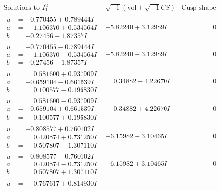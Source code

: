 \documentclass[1p]{elsarticle_modified}
\theoremstyle{definition}
\newcommand{\I}{\sqrt{-1}}
\begin{document}
$$\begin{array}{c|c|c}
\text{Solutions to }I^u_{1}& \I (\text{vol} + \sqrt{-1}CS) & \text{Cusp shape}\\
 \hline 
\begin{aligned}
u &= -0.770455 + 0.789444 I \\
a &= \phantom{-}1.106370 + 0.534564 I \\
b &= -0.27456 - 1.87357 I\end{aligned}
 & -5.82240 + 3.12989 I & \phantom{-0.000000 } 0 \\ \hline\begin{aligned}
u &= -0.770455 - 0.789444 I \\
a &= \phantom{-}1.106370 - 0.534564 I \\
b &= -0.27456 + 1.87357 I\end{aligned}
 & -5.82240 - 3.12989 I & \phantom{-0.000000 } 0 \\ \hline\begin{aligned}
u &= \phantom{-}0.581600 + 0.937909 I \\
a &= -0.659104 - 0.661539 I \\
b &= \phantom{-}0.100577 - 0.196830 I\end{aligned}
 & \phantom{-}0.34882 - 4.22670 I & \phantom{-0.000000 } 0 \\ \hline\begin{aligned}
u &= \phantom{-}0.581600 - 0.937909 I \\
a &= -0.659104 + 0.661539 I \\
b &= \phantom{-}0.100577 + 0.196830 I\end{aligned}
 & \phantom{-}0.34882 + 4.22670 I & \phantom{-0.000000 } 0 \\ \hline\begin{aligned}
u &= -0.808577 + 0.760102 I \\
a &= \phantom{-}0.420874 + 0.731250 I \\
b &= \phantom{-}0.507807 - 1.307110 I\end{aligned}
 & -6.15982 - 3.10465 I & \phantom{-0.000000 } 0 \\ \hline\begin{aligned}
u &= -0.808577 - 0.760102 I \\
a &= \phantom{-}0.420874 - 0.731250 I \\
b &= \phantom{-}0.507807 + 1.307110 I\end{aligned}
 & -6.15982 + 3.10465 I & \phantom{-0.000000 } 0 \\ \hline\begin{aligned}
u &= \phantom{-}0.767617 + 0.814930 I \\

\end{aligned}
\end{array}$$
\end{document}
